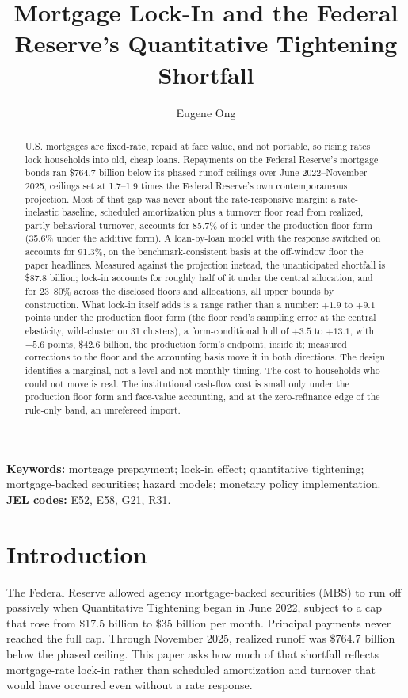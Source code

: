 \documentclass[12pt]{article}
\title{Mortgage Lock-In and the Federal Reserve's Quantitative Tightening Shortfall}
\author{Eugene Ong}
\affil{Carnegie Mellon University}
\date{}
\begin{document}
\maketitle
\begin{abstract}
\noindent U.S. mortgages are fixed-rate, repaid at face value, and not portable, so rising rates lock households into old, cheap loans. Repayments on the Federal Reserve's mortgage bonds ran \$764.7 billion below its phased runoff ceilings over June 2022--November 2025, ceilings set at 1.7--1.9 times the Federal Reserve's own contemporaneous projection. Most of that gap was never about the rate-responsive margin: a rate-inelastic baseline, scheduled amortization plus a turnover floor read from realized, partly behavioral turnover, accounts for 85.7\% of it under the production floor form (35.6\% under the additive form). A loan-by-loan model with the response switched on accounts for 91.3\%, on the benchmark-consistent basis at the off-window floor the paper headlines. Measured against the projection instead, the unanticipated shortfall is \$87.8 billion; lock-in accounts for roughly half of it under the central allocation, and for 23--80\% across the disclosed floors and allocations, all upper bounds by construction. What lock-in itself adds is a range rather than a number: $+1.9$ to $+9.1$ points under the production floor form (the floor read's sampling error at the central elasticity, wild-cluster on 31 clusters), a form-conditional hull of $+3.5$ to $+13.1$, with $+5.6$ points, \$42.6 billion, the production form's endpoint, inside it; measured corrections to the floor and the accounting basis move it in both directions. The design identifies a marginal, not a level and not monthly timing. The cost to households who could not move is real. The institutional cash-flow cost is small only under the production floor form and face-value accounting, and at the zero-refinance edge of the rule-only band, an unrefereed import.
\end{abstract}

\vspace{0.5\baselineskip}
{\footnotesize\noindent\textbf{Keywords:} mortgage prepayment; lock-in effect; quantitative tightening; mortgage-backed securities; hazard models; monetary policy implementation.\\
\textbf{JEL codes:} E52, E58, G21, R31.\par}
\newpage
\section{Introduction}\label{sec:intro}
The Federal Reserve allowed agency mortgage-backed securities (MBS) to run off
passively when Quantitative Tightening began in June 2022, subject to a cap that
rose from \$17.5 billion to \$35 billion per month. Principal payments never
reached the full cap. Through November 2025, realized runoff was \$764.7 billion
below the phased ceiling. This paper asks how much of that shortfall reflects
mortgage-rate lock-in rather than scheduled amortization and turnover that would
have occurred even without a rate response.
\end{document}
